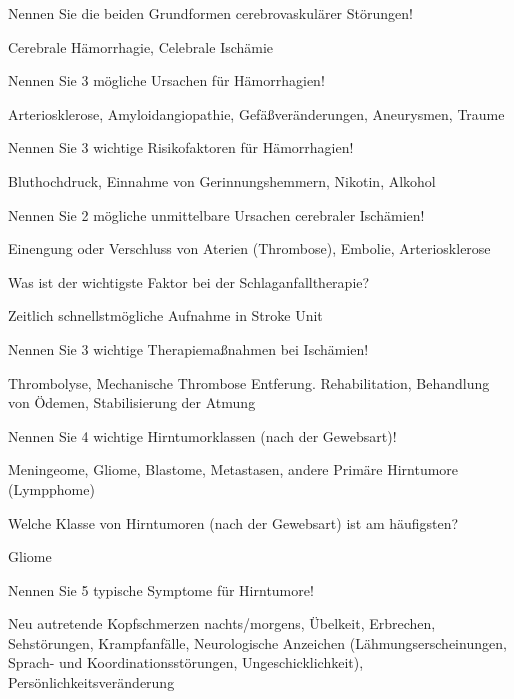 \documentclass[10pt, a4paper]{exam}
\begin{document}
\begin{questions}
  \question Nennen Sie die beiden Grundformen cerebrovaskulärer Störungen!
  \begin{solution}
    Cerebrale Hämorrhagie, Celebrale Ischämie
  \end{solution}

  \question Nennen Sie 3 mögliche Ursachen für Hämorrhagien!
  \begin{solution}
    Arteriosklerose, Amyloidangiopathie, Gefäßveränderungen, Aneurysmen, Traume
  \end{solution}

  \question Nennen Sie 3 wichtige Risikofaktoren für Hämorrhagien!
  \begin{solution}
    Bluthochdruck, Einnahme von Gerinnungshemmern, Nikotin, Alkohol
  \end{solution}

  \question Nennen Sie 2 mögliche unmittelbare Ursachen cerebraler Ischämien!
  \begin{solution}
    Einengung oder Verschluss von Aterien (Thrombose), Embolie, Arteriosklerose
  \end{solution}

  \question Was ist der wichtigste Faktor bei der Schlaganfalltherapie?
  \begin{solution}
    Zeitlich schnellstmögliche Aufnahme in Stroke Unit
  \end{solution}

  \question Nennen Sie 3 wichtige Therapiemaßnahmen bei Ischämien!
  \begin{solution}
    Thrombolyse, Mechanische Thrombose Entferung. Rehabilitation, Behandlung von Ödemen, Stabilisierung der Atmung
  \end{solution}

  \question Nennen Sie 4 wichtige Hirntumorklassen (nach der Gewebsart)!
  \begin{solution}
    Meningeome, Gliome, Blastome, Metastasen, andere Primäre Hirntumore (Lympphome)
  \end{solution}

  \question Welche Klasse von Hirntumoren (nach der Gewebsart) ist am häufigsten?
  \begin{solution}
    Gliome
  \end{solution}

  \question Nennen Sie 5 typische Symptome für Hirntumore!
  \begin{solution}
    Neu autretende Kopfschmerzen nachts/morgens, Übelkeit, Erbrechen, Sehstörungen, Krampfanfälle, Neurologische Anzeichen (Lähmungserscheinungen, Sprach- und Koordinationsstörungen,
    Ungeschicklichkeit), Persönlichkeitsveränderung
  \end{solution}


\end{questions}
\end{document}
